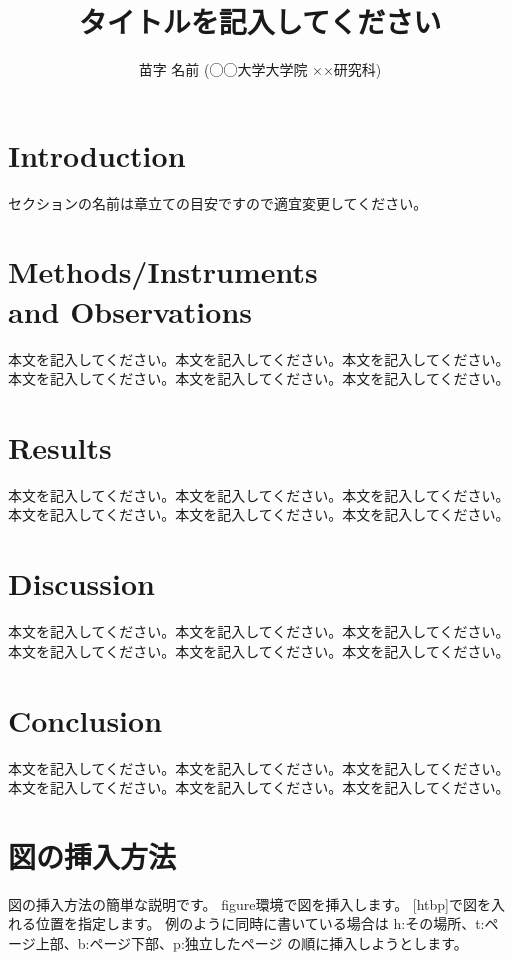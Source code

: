 \documentclass[a4paper,10pt,oneside,twocolumn,notitlepage,final]{jarticle}
\author{苗字 名前 (◯◯大学大学院 ××研究科)}
\title{タイトルを記入してください}
\begin{document}



\section{Introduction}
セクションの名前は章立ての目安ですので適宜変更してください。


\section{Methods/Instruments \\ and Observations}
本文を記入してください。本文を記入してください。本文を記入してください。本文を記入してください。本文を記入してください。本文を記入してください。


\section{Results}
本文を記入してください。本文を記入してください。本文を記入してください。本文を記入してください。本文を記入してください。本文を記入してください。


\section{Discussion}
本文を記入してください。本文を記入してください。本文を記入してください。本文を記入してください。本文を記入してください。本文を記入してください。


\section{Conclusion}
本文を記入してください。本文を記入してください。本文を記入してください。本文を記入してください。本文を記入してください。本文を記入してください。


\section{図の挿入方法}
図の挿入方法の簡単な説明です。
figure環境で図を挿入します。
[htbp]で図を入れる位置を指定します。
例のように同時に書いている場合は
h:その場所、t:ページ上部、b:ページ下部、p:独立したページ
の順に挿入しようとします。
\end{document}
